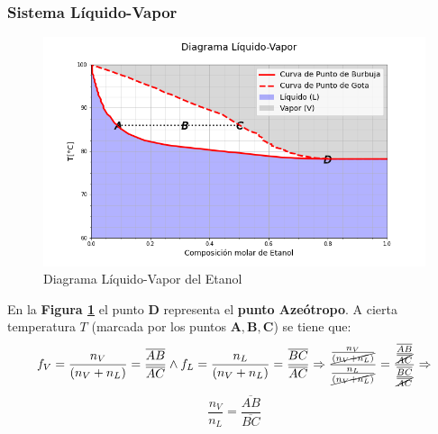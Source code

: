             
            \begin{quote}
                \textit{}
            \end{quote}
        
        \subsubsection{Sistema Líquido-Vapor}
        
            
            \begin{quote}
                \textit{}
            \end{quote}
            
            \begin{figure}
                \centering
                \includegraphics[width=.7\textwidth]{img/graficos/diag_l_v_etanol.png}
                \caption{Diagrama Líquido-Vapor del Etanol}
                \label{fig:diag_l_v_etanol}
            \end{figure}
            
            En la \textbf{Figura \ref{fig:diag_l_v_etanol}} el punto \(\mathbf{D}\) representa el \textbf{punto Azeótropo}. A cierta temperatura \(T\) (marcada por los puntos \(\mathbf{A, B, C}\)) se tiene que:
            \[f_{V} = \frac{n_{V}}{\left ( n_{V} + n_{L}\right )} = \frac{\overline{AB}}{\overline{AC}} \wedge f_{L} = \frac{n_{L}}{\left ( n_{V} + n_{L}\right )} = \frac{\overline{BC}}{\overline{AC}} \Rightarrow \frac{\frac{n_{V}}{\cancel{\left ( n_{V} + n_{L}\right )}}}{\frac{n_{L}}{\cancel{\left ( n_{V} + n_{L}\right )}}} = \frac{\frac{\overline{AB}}{\cancel{\overline{AC}}}}{\frac{\overline{BC}}{\cancel{\overline{AC}}}} \Rightarrow\]
            \[\frac{n_{V}}{n_{L}} = \frac{\overline{AB}}{\overline{BC}}\]
            \newpage
        
